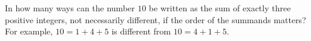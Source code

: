 In how many ways can the number $10$ be written as the sum of exactly three positive integers, not necessarily different, if the order of the summands matters? For example, $10=1+4+5$ is different from $10=4+1+5$.
